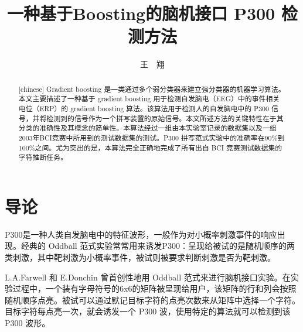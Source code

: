 \documentclass[a4paper]{ecust_thesis_translation}
\author{王\ \ 翔}
\title{一种基于Boosting的脑机接口 P300 检测方法}
\renewcommand\![1]{\immature{#1}}
\begin{document}
\setlength{\parindent}{2em}


\maketitle

\begin{abstract}[chinese]
Gradient boosting 是一类通过多个弱分类器来建立强分类器的机器学习算法。本文主要描述了一种基于 gradient boosting 用于检测自发脑电（EEG）中的事件相关电位（ERP）的 gradient boosting 算法。该算法用于检测人的自发脑电中的 P300 信号，并将检测到的信号作为一个拼写装置的原始信号。本文所述方法的关键特性在于其分类的准确性及其概念的简单性。本算法经过一组由本实验室记录的数据集以及一组2003年BCI竞赛中所用到的测试数据集的测试。P300 拼写范式实验中的准确率在90\%到100\%之间。尤为突出的是，本算法完全正确地完成了所有出自 BCI 竞赛测试数据集的字符推断任务。
\end{abstract}

\section{导论}

P300是一种人类自发脑电中的特征波形，一般作为对小概率刺激事件的响应出现。经典的 Oddball 范式实验常常用来诱发P300：呈现给被试的是随机顺序的两类刺激，其中靶刺激为小概率事件，被试则被要求判断刺激是否为靶刺激。

L.A.Farwell 和 E.Donchin 曾首创性地用 Oddball 范式来进行脑机接口实验。在实验过程中，一个装有字母符号的6x6的矩阵被呈现给用户，该矩阵的行和列会按照随机顺序点亮。被试可以通过默记目标字符的点亮次数来从矩阵中选择一个字符。目标字符每点亮一次，就会诱发一个 P300 波，使用特定的算法就可以检测到该 P300 波形。
\end{document}

